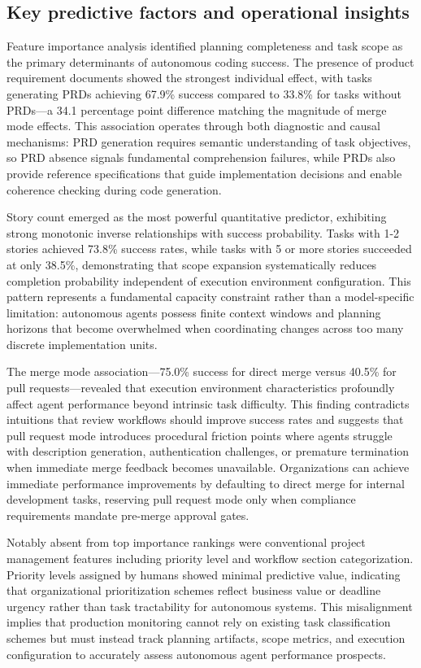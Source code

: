 \documentclass[]{article}
\begin{document}
\subsection{Key predictive factors and operational insights}

Feature importance analysis identified planning completeness and task scope as the primary determinants of autonomous coding success. The presence of product requirement documents showed the strongest individual effect, with tasks generating PRDs achieving 67.9\% success compared to 33.8\% for tasks without PRDs—a 34.1 percentage point difference matching the magnitude of merge mode effects. This association operates through both diagnostic and causal mechanisms: PRD generation requires semantic understanding of task objectives, so PRD absence signals fundamental comprehension failures, while PRDs also provide reference specifications that guide implementation decisions and enable coherence checking during code generation.

Story count emerged as the most powerful quantitative predictor, exhibiting strong monotonic inverse relationships with success probability. Tasks with 1-2 stories achieved 73.8\% success rates, while tasks with 5 or more stories succeeded at only 38.5\%, demonstrating that scope expansion systematically reduces completion probability independent of execution environment configuration. This pattern represents a fundamental capacity constraint rather than a model-specific limitation: autonomous agents possess finite context windows and planning horizons that become overwhelmed when coordinating changes across too many discrete implementation units.

The merge mode association—75.0\% success for direct merge versus 40.5\% for pull requests—revealed that execution environment characteristics profoundly affect agent performance beyond intrinsic task difficulty. This finding contradicts intuitions that review workflows should improve success rates and suggests that pull request mode introduces procedural friction points where agents struggle with description generation, authentication challenges, or premature termination when immediate merge feedback becomes unavailable. Organizations can achieve immediate performance improvements by defaulting to direct merge for internal development tasks, reserving pull request mode only when compliance requirements mandate pre-merge approval gates.

Notably absent from top importance rankings were conventional project management features including priority level and workflow section categorization. Priority levels assigned by humans showed minimal predictive value, indicating that organizational prioritization schemes reflect business value or deadline urgency rather than task tractability for autonomous systems. This misalignment implies that production monitoring cannot rely on existing task classification schemes but must instead track planning artifacts, scope metrics, and execution configuration to accurately assess autonomous agent performance prospects.
\end{document}
